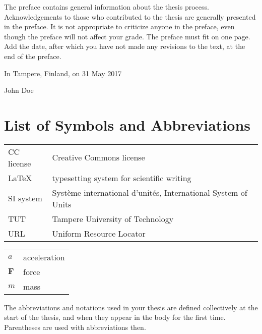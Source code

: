 \documentclass[twoside,draftfooter]{tutthesis} %
\begin{document}
The preface contains general information about the thesis process.
Acknowledgements to those who contributed to the thesis are generally presented in the preface.
It is not appropriate to criticize anyone in the preface, even though the preface will not affect your grade.
The preface must fit on one page.
Add the date, after which you have not made any revisions to the text, at the end of the preface.

\vspace{2\baselineskip}

In Tampere, Finland, on 31 May 2017

\vspace{2\baselineskip}

John Doe



\tableofcontents

\listoffigures



\chapter*{List of Symbols and Abbreviations}


\begin{tabular}[h]{@{} p{} p{} @{}}
CC license & Creative Commons license \\
LaTeX & typesetting system for scientific writing \\
SI system & Système international d'unités, International System of Units \\
TUT & Tampere University of Technology \\
URL & Uniform Resource Locator 
\end{tabular}

\begin{tabular}[h]{@{} p{} p{} @{}}
$a$ & acceleration \\
$\mathbf{F}$ & force \\
$m$ & mass
\end{tabular}

The abbreviations and notations used in your thesis are defined collectively at the start of the thesis, and when they appear in the body for the first time.
Parentheses are used with abbreviations then.
\end{document}

